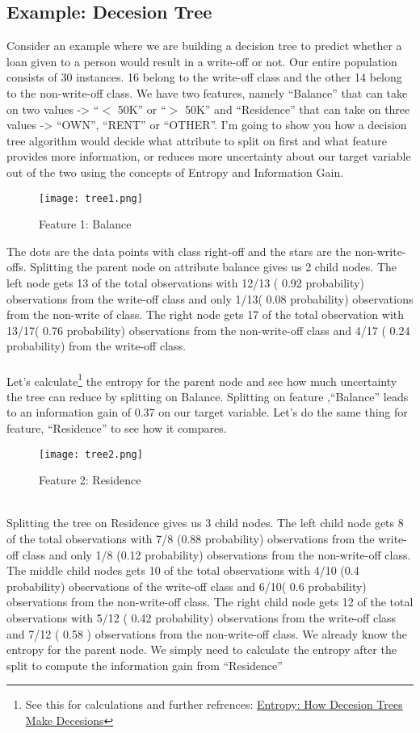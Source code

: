 \documentclass[12pt, A4]{report}
\begin{document}
\subsection*{Example: Decesion Tree}
	Consider an example where we are building a decision tree to predict whether a loan given to a person would result in a write-off or not. Our entire population consists of 30 instances. 16 belong to the write-off class and the other 14 belong to the non-write-off class. We have two features, namely “Balance” that can take on two values -> “$<$ 50K” or “$>$ 50K” and “Residence” that can take on three values -> “OWN”, “RENT” or “OTHER”. I’m going to show you how a decision tree algorithm would decide what attribute to split on first and what feature provides more information, or reduces more uncertainty about our target variable out of the two using the concepts of Entropy and Information Gain.
	\begin{figure}[h]
		\centering
		\texttt{[image: tree1.png]}
		\caption{Feature 1: Balance}
	\end{figure}
	The dots are the data points with class right-off and the stars are the non-write-offs. Splitting the parent node on attribute balance gives us 2 child nodes. The left node gets 13 of the total observations with 12/13 ( 0.92 probability) observations from the write-off class and only 1/13( 0.08 probability) observations from the non-write of class. The right node gets 17 of the total observation with 13/17( 0.76 probability) observations from the non-write-off class and 4/17 ( 0.24 probability) from the write-off class.
	\\ \\Let’s calculate\footnote[1]{See this for calculations and further refrences: \href{https://towardsdatascience.com/entropy-how-decision-trees-make-decisions-2946b9c18c8}{Entropy: How Decesion Trees Make Decesions}} the entropy for the parent node and see how much uncertainty the tree can reduce by splitting on Balance.	
	Splitting on feature ,“Balance” leads to an information gain of 0.37 on our target variable. Let’s do the same thing for feature, “Residence” to see how it compares.\\ 
	\begin{figure}[h]
		\centering
		\texttt{[image: tree2.png]}
		\caption{Feature 2: Residence}
	\end{figure}
	\\
	Splitting the tree on Residence gives us 3 child nodes. The left child node gets 8 of the total observations with 7/8 (0.88 probability) observations from the write-off class and only 1/8 (0.12 probability) observations from the non-write-off class. The middle child nodes gets 10 of the total observations with 4/10 (0.4 probability) observations of the write-off class and 6/10( 0.6 probability) observations from the non-write-off class. The right child node gets 12 of the total observations with 5/12 ( 0.42 probability) observations from the write-off class and 7/12 ( 0.58 ) observations from the non-write-off class. We already know the entropy for the parent node. We simply need to calculate the entropy after the split to compute the information gain from “Residence”
\end{document}
